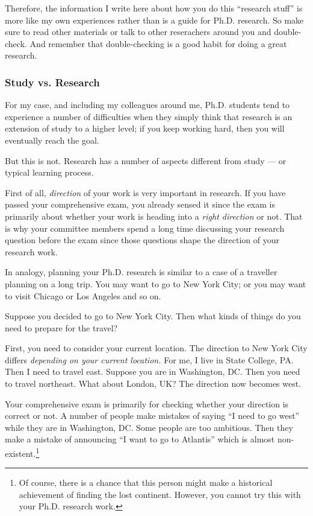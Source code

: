 \documentclass[11pt]{article}
\begin{document}
Therefore, the information I write here about how you do this ``research
stuff'' is more like my own experiences rather than is a guide for Ph.D.
research. So make sure to read other materials or talk to other reserachers
around you and double-check. And remember that double-checking is a good habit
for doing a great research.

\subsubsection{Study vs. Research}

For my case, and including my colleagues around me, Ph.D. students tend to
experience a number of difficulties when they simply think that research is
an extension of study to a higher level; if you keep working hard, then you
will eventually reach the goal.

But this is not. Research has a number of aspects different from study --- or
typical learning process.

First of all, \emph{direction} of your work is very important in research. If
you have passed your comprehensive exam, you already sensed it since the exam
is primarily about whether your work is heading into a \emph{right direction}
or not. That is why your committee members spend a long time discussing your
research question before the exam since those questions shape the direction of
your research work. 

In analogy, planning your Ph.D. research is similar to a case of a traveller
planning on a long trip. You may want to go to New York City; or you may want
to visit Chicago or Los Angeles and so on. 

Suppose you decided to go to New York City. Then what kinds of things do you
need to prepare for the travel?

First, you need to consider your current location. The direction to New York
City differs \emph{depending on your current location.} For me, I live in
State College, PA. Then I need to travel east. Suppose you are in Washington,
DC. Then you need to travel northeast. What about London, UK? The direction
now becomes west.

Your comprehensive exam is primarily for checking whether your direction is
correct or not. A number of people make mistakes of saying ``I need to go
west'' while they are in Washington, DC. Some people are too ambitious. Then
they make a mistake of announcing ``I want to go to Atlantis'' which is almost
non-existent.\footnote{Of course, there is a chance that this person might
make a historical achievement of finding the lost continent.  However, you
cannot try this with your Ph.D. research work.}
\end{document}
